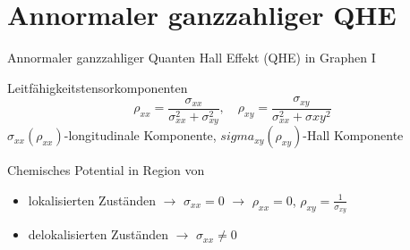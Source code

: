 \documentclass[../defence.tex]{subfiles}
\begin{document}
  \section{Annormaler ganzzahliger QHE}

  \begin{frame}{Annormaler ganzzahliger Quanten Hall Effekt (QHE) in Graphen I}
    \pause
    \begin{block}{Leitfähigkeitstensorkomponenten}
      \begin{equation*}
        \rho_{xx}=\frac{\sigma_{xx}}{\sigma_{xx}^2+\sigma_{xy}^2},\quad \rho_{xy}=\frac{\sigma_{xy}}{\sigma_{xx}^2+\sigma{xy}^2}
      \end{equation*}
      $\sigma_{xx}(\rho_{xx})$-longitudinale Komponente, $sigma_{xy}(\rho_{xy})$-Hall Komponente
    \end{block}
    \pause
    \begin{block}{Chemisches Potential in Region von}
      \pause
      \begin{itemize}
        \item lokalisierten Zuständen $\rightarrow$ $\sigma_{xx}=0$ $\rightarrow$ $\rho_{xx}=0$, $\rho_{xy}=\frac{1}{\sigma_{xy}}$
        \pause
        \item delokalisierten Zuständen $\rightarrow$ $\sigma_{xx}\ne 0$
      \end{itemize}
    \end{block}
  \end{frame}
\end{document}
